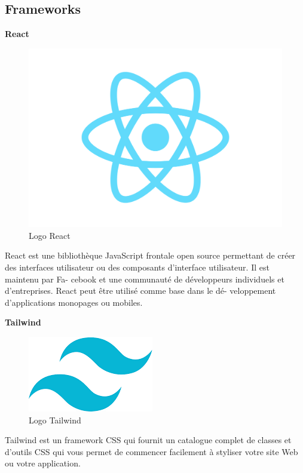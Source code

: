 \subsection{Frameworks}
\large
\textbf{React}
\begin{figure}[htbp]
   \centering
   \includegraphics[scale=0.1]{Images/react.png} 
   \caption{Logo React}
   \label{fig:react}
\end{figure}

React est une bibliothèque JavaScript frontale open source 
permettant de créer des interfaces utilisateur ou des composants 
d’interface utilisateur. Il est maintenu par Fa- cebook et une 
communauté de développeurs individuels et d’entreprises. React 
peut être utilisé comme base dans le dé- veloppement d’applications 
monopages ou mobiles.
\newline

\large
\textbf{Tailwind}
\begin{figure}[htbp]
   \centering
   \includegraphics[scale=0.6]{Images/tailwind.png} 
   \caption{Logo Tailwind}
   \label{fig:tailwind}
\end{figure}

Tailwind est un framework CSS qui fournit un catalogue complet de 
classes et d’outils CSS qui vous permet de commencer facilement 
à styliser votre site Web ou votre application.
\newline

